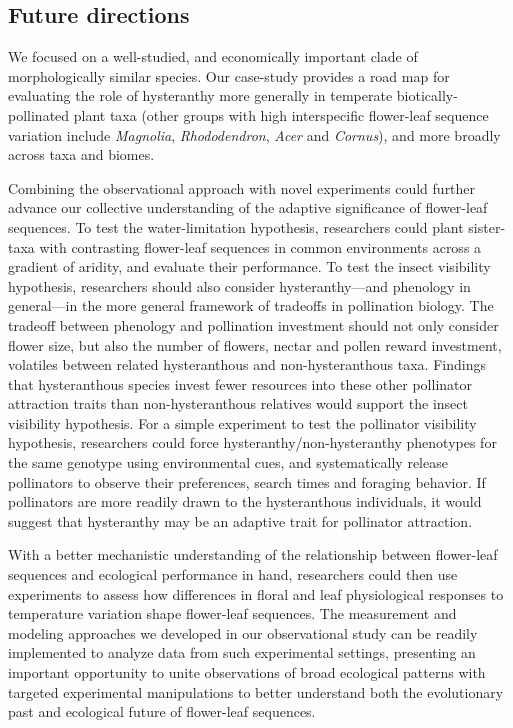 \documentclass{article}[12pt]
\begin{document}
{\subsection*{Future directions}
We focused on a well-studied, and economically important clade of morphologically similar species. Our case-study provides a road map for evaluating the role of hysteranthy more generally in temperate biotically-pollinated plant taxa (other groups with high interspecific flower-leaf sequence variation include \emph{Magnolia}, \emph{Rhododendron}, \emph{Acer} and \emph{Cornus}), and more broadly across taxa and biomes.

Combining the observational approach with novel experiments could further advance our collective understanding of the adaptive significance of flower-leaf sequences. To test the water-limitation hypothesis, researchers could plant sister-taxa with contrasting flower-leaf sequences in common environments across a gradient of aridity, and evaluate their performance. To test the insect visibility hypothesis, researchers should also consider hysteranthy---and phenology in general---in the more general framework of tradeoffs in pollination biology. The tradeoff between phenology and pollination investment should not only consider flower size, but also the number of flowers, nectar and pollen reward investment, volatiles between related hysteranthous and non-hysteranthous taxa. Findings that hysteranthous species invest fewer resources into these other pollinator attraction traits than non-hysteranthous relatives would support the insect visibility hypothesis. For a simple experiment to test the pollinator visibility hypothesis, researchers could force hysteranthy/non-hysteranthy phenotypes for the same genotype using environmental cues, and systematically release pollinators to observe their preferences, search times and foraging behavior. If pollinators are more readily drawn to the hysteranthous individuals, it would suggest that hysteranthy may be an adaptive trait for pollinator attraction. 

With a better mechanistic understanding of the relationship between flower-leaf sequences and ecological performance in hand, researchers could then use experiments to assess how differences in floral and leaf physiological responses to temperature variation shape flower-leaf sequences. The measurement and modeling approaches we developed in our observational study can be readily implemented to analyze data from such experimental settings, presenting an important opportunity to unite observations of broad ecological patterns with targeted experimental manipulations to better understand both the evolutionary past and ecological future of flower-leaf sequences.


}
\end{document}
